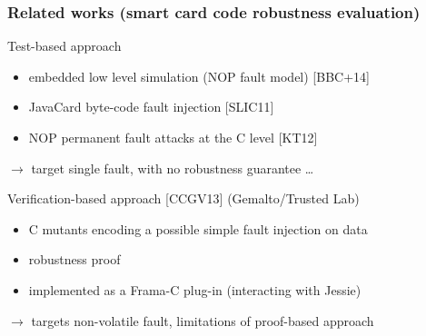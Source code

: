 \begin{frame} \frametitle{Related works (smart card code robustness evaluation)} 
\vfill
\begin{block}{Test-based approach}
\begin{itemize}
\item embedded low level simulation (NOP fault model) [BBC+14] %
\item JavaCard byte-code fault injection [SLIC11]  %
\item NOP permanent fault attacks at the C level [KT12] %
\end{itemize}
$\rightarrow$ target single fault, with no robustness guarantee \dots
\end{block}
\vfill
\begin{block}{Verification-based approach
[CCGV13] (Gemalto/Trusted Lab)}  
\begin{itemize}
\item C mutants encoding a possible simple fault injection on data 
\item robustness proof %
\item implemented as a Frama-C plug-in (interacting with Jessie)
\end{itemize}
$\rightarrow$ targets non-volatile fault, limitations of proof-based approach

\end{block}
\end{frame}

